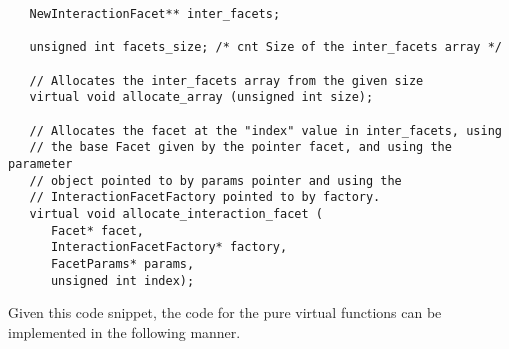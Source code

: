 \begin{verbatim}
   NewInteractionFacet** inter_facets;

   unsigned int facets_size; /* cnt Size of the inter_facets array */

   // Allocates the inter_facets array from the given size
   virtual void allocate_array (unsigned int size);

   // Allocates the facet at the "index" value in inter_facets, using
   // the base Facet given by the pointer facet, and using the parameter
   // object pointed to by params pointer and using the
   // InteractionFacetFactory pointed to by factory.
   virtual void allocate_interaction_facet (
      Facet* facet,
      InteractionFacetFactory* factory,
      FacetParams* params,
      unsigned int index);
\end{verbatim}

Given this code snippet, the code for the pure virtual functions can be implemented in
the following manner.


